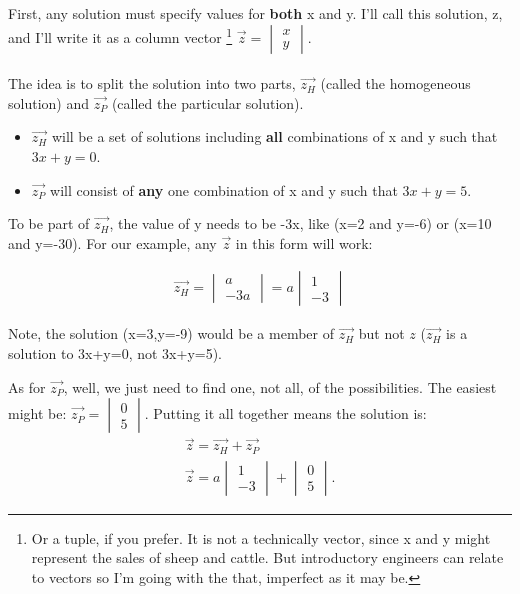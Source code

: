 First, any solution must specify values for \textbf{both} x and y. I'll call this solution, z, and I'll write it as a column vector \footnote{Or a tuple, if you prefer. It is not a technically vector, since x and y might represent the sales of sheep and cattle. But introductory engineers can relate to vectors so I'm going with the that, imperfect as it may be.} $\vec{z}= \begin{vmatrix}x\\y\end{vmatrix}$.\\
\\
The idea is to split the solution into two parts, $\vec{z_H}$ (called the homogeneous solution) and $\vec{z_P}$ (called the particular solution).
\begin{itemize}
\item $\vec{z_H}$ will be a set of solutions including \textbf{all} combinations of x and y such that $3x+y=0$. 
\item $\vec{z_P}$ will consist of \textbf{any} one combination of x and y such that $3x+y=5$.
\end{itemize}

To be part of $\vec{z_H}$, the value of y needs to be -3x, like (x=2 and y=-6) or (x=10 and y=-30). For our example, any $\vec{z}$ in this form will work: 

\begin{align}
\vec{z_H}= \begin{vmatrix}a\\-3a\end{vmatrix}=a\begin{vmatrix}1\\-3\end{vmatrix}
\end{align} 

Note, the solution (x=3,y=-9) would be a member of $\vec{z_H}$ but not $z$ ($\vec{z_H}$ is a solution to 3x+y=0, not 3x+y=5).\par

As for $\vec{z_P}$, well, we just need to find one, not all, of the possibilities. The easiest might be: $\vec{z_P}= \begin{vmatrix}0\\5\end{vmatrix}$. Putting it all together means the solution is:\\

\begin{align*}
\vec{z}=\vec{z_H}+\vec{z_P}\\
\vec{z}= a\begin{vmatrix}1\\-3\end{vmatrix}+\begin{vmatrix}0\\5\end{vmatrix}.
\end{align*} 


